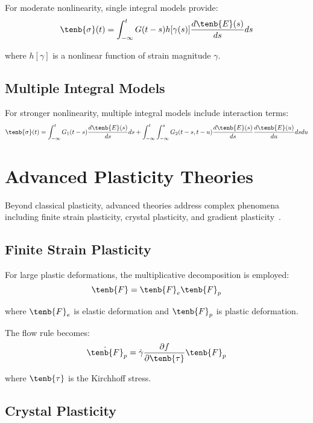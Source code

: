 For moderate nonlinearity, single integral models provide:
\begin{equation}
\tenb{\sigma}(t) = \int_{-\infty}^t G(t-s) h[\gamma(s)] \frac{d\tenb{E}(s)}{ds} ds
\end{equation}

where $h[\gamma]$ is a nonlinear function of strain magnitude $\gamma$.

\subsection{Multiple Integral Models}

For stronger nonlinearity, multiple integral models include interaction terms:
\begin{equation}
\tenb{\sigma}(t) = \int_{-\infty}^t G_1(t-s) \frac{d\tenb{E}(s)}{ds} ds + \int_{-\infty}^t\int_{-\infty}^s G_2(t-s,t-u) \frac{d\tenb{E}(s)}{ds} \frac{d\tenb{E}(u)}{du} ds du
\end{equation}

\section{Advanced Plasticity Theories}

Beyond classical plasticity, advanced theories address complex phenomena including finite strain plasticity, crystal plasticity, and gradient plasticity~\autocite{Sadd.2019}.

\subsection{Finite Strain Plasticity}

For large plastic deformations, the multiplicative decomposition is employed:
\begin{equation}
\tenb{F} = \tenb{F}_e \tenb{F}_p
\end{equation}

where $\tenb{F}_e$ is elastic deformation and $\tenb{F}_p$ is plastic deformation.

The flow rule becomes:
\begin{equation}
\dot{\tenb{F}}_p = \dot{\gamma} \frac{\partial f}{\partial \tenb{\tau}} \tenb{F}_p
\end{equation}

where $\tenb{\tau}$ is the Kirchhoff stress.

\subsection{Crystal Plasticity}

